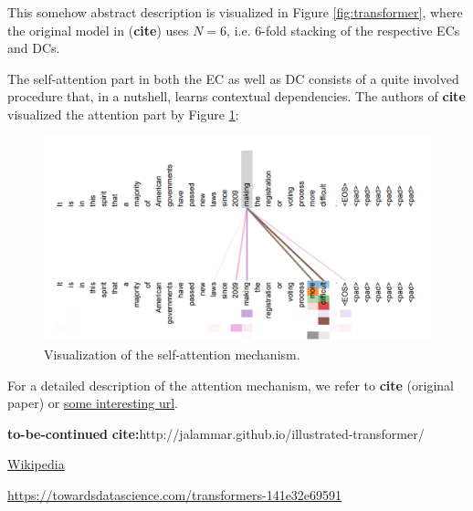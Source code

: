 \documentclass[11pt,a4paper]{article}
\begin{document}
This somehow abstract description is visualized in Figure \ref{fig:transformer}, where the original model in (\textbf{cite}) uses $N=6$, i.e. 6-fold stacking of the respective ECs and DCs.

The self-attention part in both the EC as well as DC consists of a quite involved procedure that, in a nutshell, learns contextual dependencies. The authors of \textbf{cite} visualized the attention part by Figure \ref{fig:attention}:

\begin{figure}[h]
    \centering
    \includegraphics[scale=0.7]{images/attention.PNG}
    \caption{Visualization of the self-attention mechanism.}
    \label{fig:attention}
\end{figure}

For a detailed description of the attention mechanism, we refer to \textbf{cite} (original paper) or \href{some interesting url}{some interesting url}.

\textbf{to-be-continued}
\textbf{cite:}http://jalammar.github.io/illustrated-transformer/


\href{https://en.wikipedia.org/wiki/Transformer_(machine_learning_model)}{Wikipedia}

\href{https://towardsdatascience.com/transformers-141e32e69591}{https://towardsdatascience.com/transformers-141e32e69591}
\end{document}
